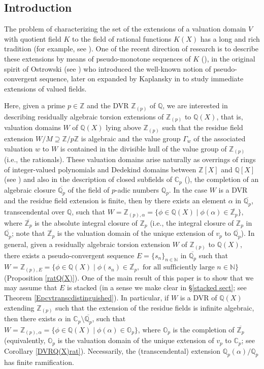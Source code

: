 \documentclass[10pt]{article}
\numberwithin{equation}{section}
\theoremstyle{definition}\newtheorem{Def}[equation]{Definition}
\theoremstyle{definition}\newtheorem{Ques}[equation]{Question}
\newcommand{\Q}{\mathbb{Q}}
\newcommand{\N}{\mathbb{N}}
\newcommand{\Z}{\mathbb{Z}}
\renewcommand{\O}{\mathbb{O}}
\newcommand{\C}{\mathbb{C}}
\newcommand{\oQp}{\overline{\Q_p}}
\newcommand{\oZp}{\overline{\Z_p}}
\begin{document}
\subsection*{Introduction}

The problem of characterizing the set of the extensions of a valuation domain $V$ with quotient field $K$ to the field of rational functions $K(X)$ has a long and rich tradition (for example, see \cite{AlePop, APZTheorem, APZMinimal,APZAll, Kap,MatOhm,PerTransc, PS1,PS2}). One of the recent direction of research is to describe these extensions by means of pseudo-monotone sequences of $K$ (\cite{PS2}), in the original spirit of Ostrowski (see \cite{Ostr}) who introduced the well-known notion of pseudo-convergent sequence, later on expanded by Kaplansky in \cite{Kap} to study immediate extensions of valued fields. 

Here, given a prime $p\in\Z$ and the DVR $\Z_{(p)}$ of $\Q$, we are interested in describing residually algebraic torsion extensions of $\Z_{(p)}$ to $\Q(X)$, that is, valuation domains $W$ of $\Q(X)$ lying above $\Z_{(p)}$ such that the residue field extension $W/M\supseteq\Z/p\Z$ is algebraic and the value group $\Gamma_w$ of the associated valuation $w$ to $W$ is contained in the divisible hull of the value group of $\Z_{(p)}$ (i.e., the rationals). These valuation domains arise naturally as overrings of rings of integer-valued polynomials and Dedekind domains between $\Z[X]$ and $\Q[X]$ (see \cite{EakHei, PerDedekind}) and also in the description of closed subfields of $\C_p$ (\cite{IovZah}), the completion of an algebraic closure $\oQp$ of the field of $p$-adic numbers $\Q_p$. In the case $W$ is a DVR and the residue field extension is finite, then by \cite[Theorem 2.5 \& Proposition 2.2]{PerTransc} there exists an element $\alpha$ in $\oQp$, transcendental over $\Q$, such that $W=\Z_{(p),\alpha}=\{\phi\in \Q(X)\mid\phi(\alpha)\in\oZp\}$, where $\oZp$ is the absolute integral closure of $\Z_p$ (i.e., the integral closure of $\Z_p$ in $\oQp$; note that $\oZp$ is the valuation domain of the unique extension of $v_p$ to $\oQp$).  
In general, given a residually algebraic torsion extension $W$ of $\Z_{(p)}$ to $\Q(X)$, there exists a pseudo-convergent sequence $E=\{s_n\}_{n\in\N}$ in $\oQp$ such that $W=\Z_{(p),E}=\{\phi\in\Q(X)\mid\phi(s_n)\in\oZp,\text{ for all sufficiently large }n\in\N\}$ (Proposition \ref{ratQ(X)}). One of the main result of this paper is to show that we may assume that $E$ is stacked (in a sense we make clear in \S \ref{stacked sect}; see Theorem \ref{Epcvtranscdistinguished}).  In particular, if $W$ is a DVR of $\Q(X)$ extending $\Z_{(p)}$ such that the extension of the residue fields is infinite algebraic, then there exists $\alpha$ in $\C_p\setminus \oQp$, such that  $W=\Z_{(p),\alpha}=\{\phi\in \Q(X)\mid\phi(\alpha)\in \O_p\}$, where $\O_p$ is the completion of $\oZp$ (equivalently, $\O_p$ is the valuation domain of the unique extension of $v_p$ to $\C_p$; see  Corollary \ref{DVRQ(X)rat}). Necessarily, the (transcendental) extension $\Q_p(\alpha)/\Q_p$ has finite ramification. 
\end{document}
